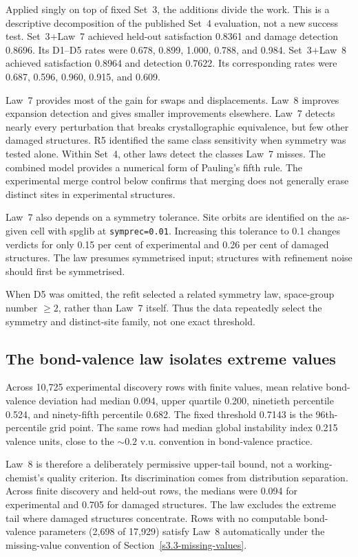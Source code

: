 Applied singly on top of fixed Set~3, the additions divide the work. This is a
descriptive decomposition of the published Set~4 evaluation, not a new success
test. Set~3$+$Law~7 achieved held-out satisfaction 0.8361 and damage detection
0.8696. Its D1--D5 rates were 0.678, 0.899, 1.000, 0.788, and 0.984. Set~3$+$Law~8
achieved satisfaction 0.8964 and detection 0.7622. Its corresponding rates were
0.687, 0.596, 0.960, 0.915, and 0.609.

Law~7 provides most of the gain for swaps and displacements. Law~8 improves
expansion detection and gives smaller improvements elsewhere. Law~7 detects
nearly every perturbation that breaks crystallographic equivalence, but few other
damaged structures. R5 identified the same class sensitivity when symmetry was
tested alone. Within Set~4, other laws detect the classes Law~7 misses. The
combined model provides a numerical form of Pauling's fifth rule. The
experimental merge control below confirms that merging does not generally erase
distinct sites in experimental structures.

Law~7 also depends on a symmetry tolerance. Site orbits are identified on the
as-given cell with spglib at \texttt{symprec=0.01}. Increasing this tolerance to
0.1 changes verdicts for only 0.15 per cent of experimental and 0.26 per cent of
damaged structures. The law presumes symmetrised input; structures with
refinement noise should first be symmetrised.

When D5 was omitted, the refit selected a related symmetry law, space-group
number $\geq2$, rather than Law~7 itself. Thus the data repeatedly select the
symmetry and distinct-site family, not one exact threshold.

\subsection{The bond-valence law isolates extreme values}

Across 10{,}725 experimental discovery rows with finite values, mean relative
bond-valence deviation had median 0.094, upper quartile 0.200, ninetieth
percentile 0.524, and ninety-fifth percentile 0.682. The fixed threshold 0.7143
is the 96th-percentile grid point. The same rows had median global instability
index 0.215 valence units, close to the $\sim0.2$ v.u. convention in bond-valence
practice.

Law~8 is therefore a deliberately permissive upper-tail bound, not a
working-chemist's quality criterion. Its discrimination comes from distribution
separation. Across finite discovery and held-out rows, the medians were 0.094 for
experimental and 0.705 for damaged structures. The law excludes the extreme tail where damaged structures concentrate.
Rows with no computable bond-valence parameters (2{,}698 of 17{,}929) satisfy Law~8
automatically under the missing-value convention of Section~\ref{s3.3-missing-values}.

